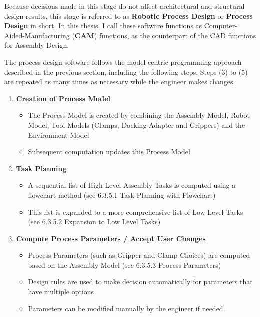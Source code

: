 Because decisions made in this stage do not affect architectural and structural design results, this stage is referred to as\textbf{ Robotic Process Design} or \textbf{Process Design }in short. In this thesis, I call these software functions as Computer-Aided-Manufacturing (\textbf{CAM}) functions, as the counterpart of the CAD functions for Assembly Design.

The process design software follows the model-centric programming approach described in the previous section, including the following steps. Steps (3) to (5) are repeated as many times as necessary while the engineer makes changes.
\begin{enumerate}
\item \textbf{Creation of Process Model}

\begin{itemize}
	\item The Process Model is created by combining the Assembly Model, Robot Model, Tool Models (Clamps, Docking Adapter and Grippers) and the Environment Model 

	\item Subsequent computation updates this Process Model

\end{itemize}

\item \textbf{Task Planning}

\begin{itemize}
	\item A sequential list of High Level Assembly Tasks is computed using a flowchart method (see 6.3.5.1 Task Planning with Flowchart)

	\item This list is expanded to a more comprehensive list of Low Level Tasks (see 6.3.5.2 Expansion to Low Level Tasks)

\end{itemize}
	\item \textbf{Compute Process Parameters / Accept User Changes}

\begin{itemize}
	\item Process Parameters (such as Gripper and Clamp Choices) are computed based on the Assembly Model (see 6.3.5.3 Process Parameters)

	\item Design rules are used to make decision automatically for parameters that have multiple options

	\item Parameters can be modified manually by the engineer if needed.


\end{itemize}
\end{enumerate}
